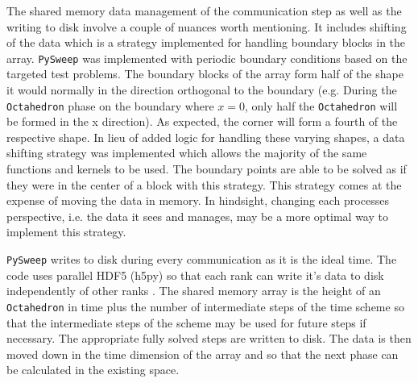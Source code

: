 \documentclass[review]{elsarticle}
\def\pysweep{\texttt{PySweep}}
\def\Oct{\texttt{Octahedron}}
\begin{document}
\par The shared memory data management of the communication step as well as the writing to disk involve a couple of nuances worth mentioning. It includes shifting of the data which is a strategy implemented for handling boundary blocks in the array. \pysweep{} was implemented with periodic boundary conditions based on the targeted test problems. The boundary blocks of the array form half of the shape it would normally in the direction orthogonal to the boundary (e.g. During the \Oct{} phase on the boundary where $x=0$, only half the \Oct{} will be formed in the x direction). As expected, the corner will form a fourth of the respective shape. In lieu of added logic for handling these varying shapes, a data shifting strategy was implemented which allows the majority of the same functions and kernels to be used. The boundary points are able to be solved as if they were in the center of a block with this strategy. This strategy comes at the expense of moving the data in memory. In hindsight, changing each processes perspective, i.e. the data it sees and manages, may be a more optimal way to implement this strategy.

\par \pysweep{} writes to disk during every communication as it is the ideal time. The code uses parallel HDF5 (h5py) so that each rank can write it's data to disk independently of other ranks \cite{Collette2008HDF5Python}. The shared memory array is the height of an \Oct{} in time plus the number of intermediate steps of the time scheme so that the intermediate steps of the scheme may be used for future steps if necessary. The appropriate fully solved steps are written to disk. The data is then moved down in the time dimension of the array and so that the next phase can be calculated in the existing space.
\end{document}
